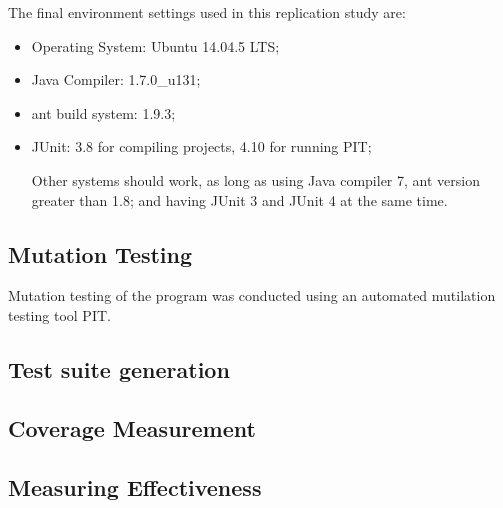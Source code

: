 The final environment settings used in this replication study are:
\begin{itemize}
	\item Operating System: Ubuntu 14.04.5 LTS;
	\item Java Compiler: 1.7.0\_u131;
	\item ant build system: 1.9.3;
	\item JUnit: 3.8 for compiling projects, 4.10 for running PIT;
	
Other systems should work, as long as using Java compiler 7, ant version greater than 1.8; and having JUnit 3 and JUnit 4  at the same time.
\end{itemize}


\subsection{Mutation Testing}
Mutation testing of the program was conducted using an automated mutilation testing tool PIT. 
\subsection{Test suite generation}
\subsection{Coverage Measurement}
\subsection{Measuring Effectiveness}